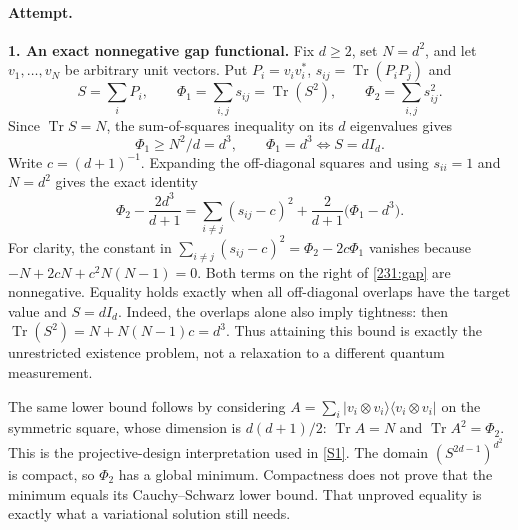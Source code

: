 \documentclass[11pt,a4paper]{article}
\newcommand{\sref}[2]{\hyperlink{source:#1:#2}{[S#2]}}
\numberwithin{equation}{section}
\begin{document}
\paragraph{Attempt.}
\textbf{1. An exact nonnegative gap functional.}
Fix $d\geq2$, set $N=d^2$, and let $v_1,\ldots,v_N$ be arbitrary unit
vectors. Put $P_i=v_iv_i^*$, $s_{ij}=\operatorname{Tr}(P_iP_j)$ and
\[
 S=\sum_iP_i,\qquad
 \Phi_1=\sum_{i,j}s_{ij}=\operatorname{Tr}(S^2),\qquad
 \Phi_2=\sum_{i,j}s_{ij}^2.
\]
Since $\operatorname{Tr}S=N$, the sum-of-squares inequality on its
$d$ eigenvalues gives
\begin{equation}\label{231:tight}
 \Phi_1\geq N^2/d=d^3,
 \qquad \Phi_1=d^3\Longleftrightarrow S=dI_d.
\end{equation}
Write $c=(d+1)^{-1}$. Expanding the off-diagonal squares and using
$s_{ii}=1$ and $N=d^2$ gives the exact identity
\begin{equation}\label{231:gap}
 \Phi_2-\frac{2d^3}{d+1}
 =\sum_{i\ne j}(s_{ij}-c)^2
       +\frac2{d+1}\bigl(\Phi_1-d^3\bigr).
\end{equation}
For clarity, the constant in
$\sum_{i\ne j}(s_{ij}-c)^2=\Phi_2-2c\Phi_1$
vanishes because $-N+2cN+c^2N(N-1)=0$.
Both terms on the right of \eqref{231:gap} are nonnegative.
Equality holds exactly when all off-diagonal overlaps have the target
value and $S=dI_d$. Indeed, the overlaps alone also imply tightness:
then $\operatorname{Tr}(S^2)=N+N(N-1)c=d^3$.
Thus attaining this bound is exactly the unrestricted existence problem,
not a relaxation to a different quantum measurement.

The same lower bound follows by considering
$A=\sum_i|v_i\otimes v_i\rangle\langle v_i\otimes v_i|$ on the
symmetric square, whose dimension is $d(d+1)/2$:
$\operatorname{Tr}A=N$ and $\operatorname{Tr}A^2=\Phi_2$.
This is the projective-design interpretation used in \sref{231}{1}.
The domain $(S^{2d-1})^{d^2}$ is compact, so $\Phi_2$ has a global
minimum. Compactness does not prove that the minimum equals its
Cauchy--Schwarz lower bound. That unproved equality is exactly what a
variational solution still needs.
\end{document}
